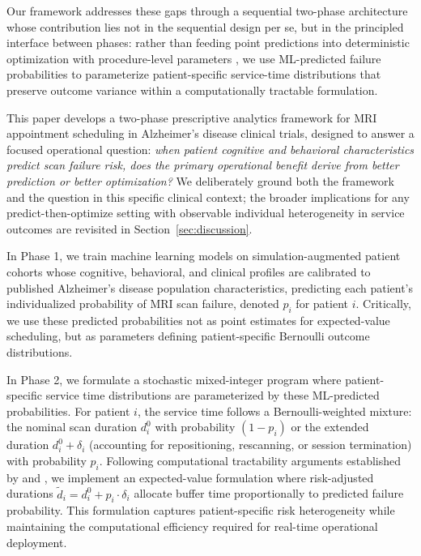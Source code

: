 \documentclass[11pt,a4paper]{article}
\begin{document}
Our framework addresses these gaps through a sequential two-phase architecture whose contribution lies not in the sequential design per se, but in the principled interface between phases: rather than feeding point predictions into deterministic optimization with procedure-level parameters \citep{salah2022predict}, we use ML-predicted failure probabilities to parameterize patient-specific service-time distributions that preserve outcome variance within a computationally tractable formulation.

This paper develops a two-phase prescriptive analytics framework for MRI appointment scheduling in Alzheimer's disease clinical trials, designed to answer a focused operational question: \textit{when patient cognitive and behavioral characteristics predict scan failure risk, does the primary operational benefit derive from better prediction or better optimization?} We deliberately ground both the framework and the question in this specific clinical context; the broader implications for any predict-then-optimize setting with observable individual heterogeneity in service outcomes are revisited in Section~\ref{sec:discussion}.

In Phase 1, we train machine learning models on simulation-augmented patient cohorts whose cognitive, behavioral, and clinical profiles are calibrated to published Alzheimer's disease population characteristics, predicting each patient's individualized probability of MRI scan failure, denoted $p_i$ for patient $i$. Critically, we use these predicted probabilities not as point estimates for expected-value scheduling, but as parameters defining patient-specific Bernoulli outcome distributions.

In Phase 2, we formulate a stochastic mixed-integer program where patient-specific service time distributions are parameterized by these ML-predicted probabilities. For patient $i$, the service time follows a Bernoulli-weighted mixture: the nominal scan duration $d_i^0$ with probability $(1-p_i)$ or the extended duration $d_i^0 + \delta_i$ (accounting for repositioning, rescanning, or session termination) with probability $p_i$. Following computational tractability arguments established by \citet{denton2003sequential} and \citet{mancilla2012sample}, we implement an expected-value formulation where risk-adjusted durations $\tilde{d}_i = d_i^0 + p_i \cdot \delta_i$ allocate buffer time proportionally to predicted failure probability. This formulation captures patient-specific risk heterogeneity while maintaining the computational efficiency required for real-time operational deployment.
\end{document}
